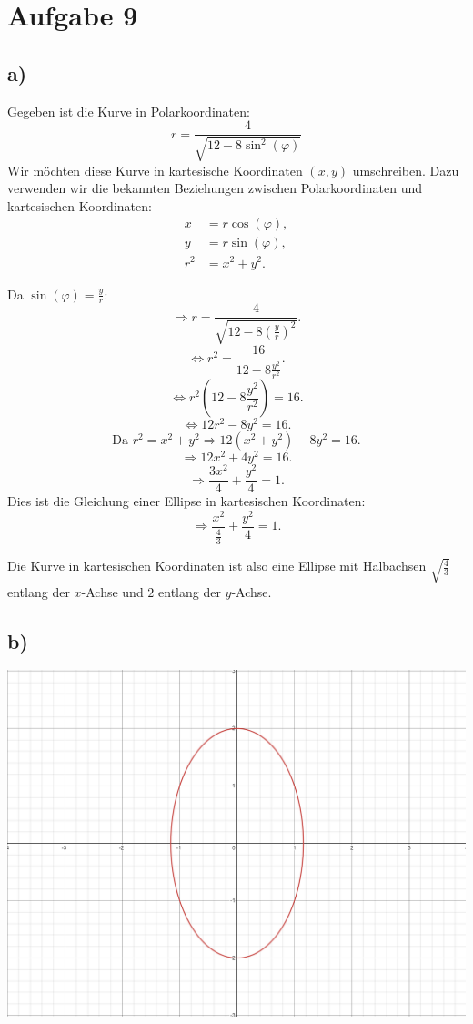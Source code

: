 \section{Aufgabe 9}
    \subsection{a)}
        Gegeben ist die Kurve in Polarkoordinaten:
        $$r = \frac{4}{\sqrt{12 - 8 \sin^2(\varphi)}}$$
        Wir möchten diese Kurve in kartesische Koordinaten $(x, y)$ umschreiben. Dazu verwenden wir die bekannten Beziehungen zwischen Polarkoordinaten und kartesischen Koordinaten:
        \begin{align*}
            x &= r \cos(\varphi), \\
            y &= r \sin(\varphi), \\
            r^2 &= x^2 + y^2.
        \end{align*}
        
        Da $\sin(\varphi) = \frac{y}{r} $:
        $$\Rightarrow r = \frac{4}{\sqrt{12 - 8 \left(\frac{y}{r}\right)^2}}.$$
        $$\Leftrightarrow r^2 = \frac{16}{12 - 8 \frac{y^2}{r^2}}.$$
        $$\Leftrightarrow r^2 \left(12 - 8 \frac{y^2}{r^2}\right) = 16.$$
        $$\Leftrightarrow 12 r^2 - 8 y^2 = 16.$$
        $$\text{Da } r^2 = x^2 + y^2 \Rightarrow 12(x^2 + y^2) - 8 y^2 = 16.$$
        $$\Rightarrow 12x^2 + 4y^2 = 16.$$
        $$ \Rightarrow \frac{3x^2}{4} + \frac{y^2}{4} = 1.$$
        Dies ist die Gleichung einer Ellipse in kartesischen Koordinaten:
        $$\Rightarrow \frac{x^2}{\frac{4}{3}} + \frac{y^2}{4} = 1.$$

        Die Kurve in kartesischen Koordinaten ist also eine Ellipse mit Halbachsen \(\sqrt{\frac{4}{3}}\) entlang der \(x\)-Achse und \(2\) entlang der \(y\)-Achse.
    \subsection{b)}
        \includegraphics[width=\textwidth]{Aufgaben/09/9b).png}